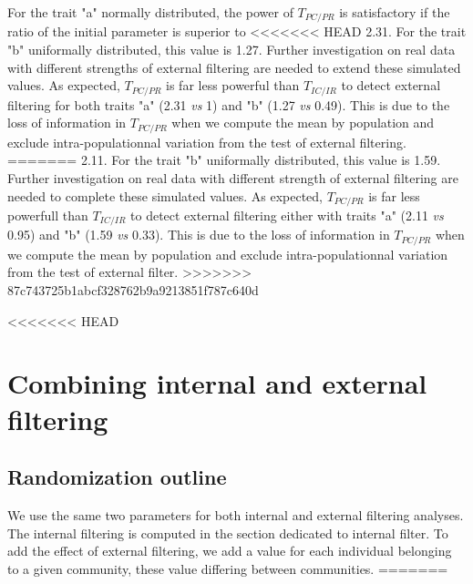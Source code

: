 \documentclass[12pt]{article}\usepackage[]{graphicx}\usepackage[]{color}
\begin{document}
\begin{landscape}
\begin{table}[ht]
{\begin{table}[ht]
{\begin{table}[ht]
{For the trait "a" normally distributed, the power of $T_{PC/PR}$ is satisfactory if the ratio of the initial parameter is superior to
<<<<<<< HEAD
 2.31. For the trait "b" uniformally distributed, this value is 1.27. 
 Further investigation on real data with different strengths of external filtering are needed to extend these simulated values. As expected, $T_{PC/PR}$ is far less powerful than $T_{IC/IR}$ to detect external filtering for both traits "a" (2.31 \textit{vs} 1) and "b" (1.27 \textit{vs} 0.49). This is due to the loss of information in $T_{PC/PR}$ when we compute the mean by population and exclude intra-populationnal variation from the test of external filtering. 
=======
 2.11. For the trait "b" uniformally distributed, this value is 1.59. 
 Further investigation on real data with different strength of external filtering are needed to complete these simulated values. As expected, $T_{PC/PR}$ is far less powerfull than $T_{IC/IR}$ to detect external filtering either with traits "a" (2.11 \textit{vs} 0.95) and "b" (1.59 \textit{vs} 0.33). This is due to the loss of information in $T_{PC/PR}$ when we compute the mean by population and exclude intra-populationnal variation from the test of external filter. 
>>>>>>> 87c743725b1abcf328762b9a9213851f787c640d




































\cleardoublepage

<<<<<<< HEAD
\section{Combining internal and external filtering}
\label{sect:IntExtFilt}

  \subsection{Randomization outline}
We use the same two parameters for both internal and external filtering analyses. The internal filtering is computed in the section dedicated to internal filter. To add the effect of external filtering, we add a value for each individual belonging to a given community, these value differing between communities.
=======
}
\end{table}}
\end{table}}
\end{table}
\end{landscape}
\end{document}
